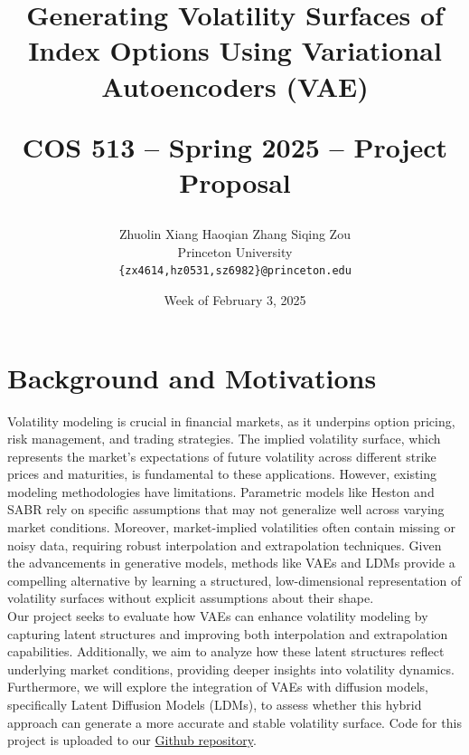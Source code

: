 \documentclass{article}
\title{Generating Volatility Surfaces of Index Options Using Variational Autoencoders (VAE)\\
\begin{large}
COS 513 -- Spring 2025 -- Project Proposal
\end{large} }
\author{%
Zhuolin Xiang \quad Haoqian Zhang \quad Siqing Zou\\
Princeton University \\
\texttt{\{zx4614,hz0531,sz6982\}@princeton.edu}
}
\date{Week of February 3, 2025}
\begin{document}
\maketitle

\section{Background and Motivations}


Volatility modeling is crucial in financial markets, as it underpins option pricing, risk management, and trading strategies. The implied volatility surface, which represents the market's expectations of future volatility across different strike prices and maturities, is fundamental to these applications. However, existing modeling methodologies have limitations. Parametric models like Heston and SABR rely on specific assumptions that may not generalize well across varying market conditions. Moreover, market-implied volatilities often contain missing or noisy data, requiring robust interpolation and extrapolation techniques. Given the advancements in generative models, methods like VAEs and LDMs provide a compelling alternative by learning a structured, low-dimensional representation of volatility surfaces without explicit assumptions about their shape.\\

Our project seeks to evaluate how VAEs can enhance volatility modeling by capturing latent structures and improving both interpolation and extrapolation capabilities. Additionally, we aim to analyze how these latent structures reflect underlying market conditions, providing deeper insights into volatility dynamics. Furthermore, we will explore the integration of VAEs with diffusion models, specifically Latent Diffusion Models (LDMs), to assess whether this hybrid approach can generate a more accurate and stable volatility surface. Code for this project is uploaded to our \href{https://github.com/zhanghq-chn/VAE-VolSurface.git}{Github repository}.
\end{document}
